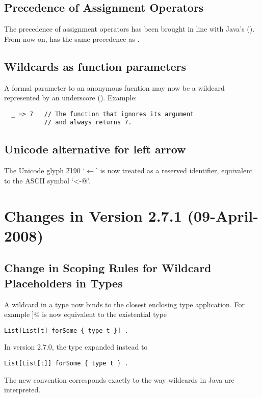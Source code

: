 \subsection*{Precedence of Assignment Operators}

The precedence of assignment operators has been brought in line with Java's 
().
From now on, \code{+=} has the same precedence as \code{=}.

\subsection*{Wildcards as function parameters}

A formal parameter to an anonymous fucntion 
may now be a wildcard represented by an underscore (). Example:
\begin{lstlisting}
  _ => 7   // The function that ignores its argument
           // and always returns 7.
\end{lstlisting}

\subsection*{Unicode alternative for left arrow}

The Unicode glyph \U{2190} `$\leftarrow$' is now treated as a reserved
identifier, equivalent to the ASCII symbol `\lstinline@<-@'.


\section*{Changes in Version 2.7.1 (09-April-2008)}

\subsection*{Change in Scoping Rules for Wildcard Placeholders in Types}

A wildcard in a type now binds to the closest enclosing type application.
For example \lstinline@List[List[_]]@ is now equivalent to the existential type
\begin{lstlisting}
List[List[t] forSome { type t }] . 
\end{lstlisting}
In version 2.7.0, the type expanded instead to 
\begin{lstlisting}
List[List[t]] forSome { type t } .
\end{lstlisting}
The new convention corresponds exactly to the way wildcards in Java are interpreted.

